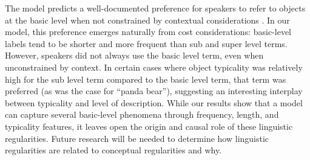 \documentclass[10pt,letterpaper]{article}
\begin{document}


The model predicts a well-documented preference for speakers  to refer to objects at the basic level when not constrained by contextual considerations  \cite{RoschEtAl76_BasicLevel}. In our model, this preference emerges naturally from cost considerations: basic-level labels tend to be shorter and more frequent than sub and super level terms. However, speakers did not always use the basic level term, even when unconstrained by context. In certain cases where object typicality was relatively high for the sub level term compared to the basic level term, that term was preferred (as was the case for ``panda bear''), suggesting an interesting interplay between typicality and level of description. 
While our results show that a model can capture several basic-level phenomena through frequency, length, and typicality features, it leaves open the origin and causal role of these linguistic regularities.
Future research will be needed to determine how linguistic regularities are related to conceptual regularities and why.
\end{document}
